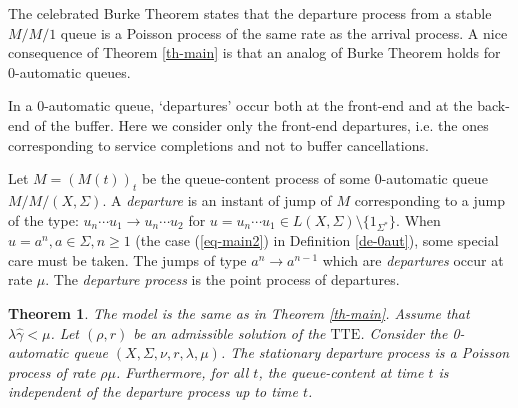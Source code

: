 \documentclass[11pt,a4paper]{article}
\newtheorem{theorem}{Theorem}[section]
\theoremstyle{remark}
\def\eref#1{(\ref{#1})}
\begin{document}
The celebrated Burke Theorem states that the departure process from a
stable $M/M/1$ queue is a Poisson process of the same rate as the
arrival process.
A nice consequence of Theorem \ref{th-main} is that an analog
of Burke Theorem holds for 0-automatic
queues.


\medskip

In a 0-automatic queue, `departures' occur both at the front-end and
at the back-end of the buffer. Here we consider only the front-end
departures, i.e. the ones corresponding to service completions and not
to buffer cancellations.

Let $M=(M(t))_t$ be the queue-content process of some 0-automatic
queue $M/M/(X,\Sigma)$. A {\em departure} is
an instant of jump of $M$ corresponding to a jump of the type:
$u_n\cdots u_1 \rightarrow u_n\cdots u_2$ for $u=u_n\cdots u_1 \in
L(X,\Sigma)\setminus \{1_{\Sigma^*}\}$.
When $u=a^n, a\in \Sigma, n\geq 1$ (the case \eref{eq-main2} in Definition
\ref{de-0aut}), some special care must be taken. The jumps of type
$a^n \rightarrow a^{n-1}$ which are {\em departures} occur at rate
$\mu$.
The {\em departure process} is the point process of
departures.

\begin{theorem}\label{th-burke}
The model is the same as in Theorem \ref{th-main}. Assume that
$\lambda\widehat{\gamma} < \mu$. Let $(\rho,r)$ be an admissible solution
of the $\text{TTE}$. Consider the 0-automatic queue
$(X,\Sigma,\nu,r,\lambda,\mu)$.
The stationary departure process is a Poisson process of rate $\rho\mu$.
Furthermore, for all $t$, the queue-content at time $t$ is
independent of the departure process up to
time $t$.
\end{theorem}
\end{document}
